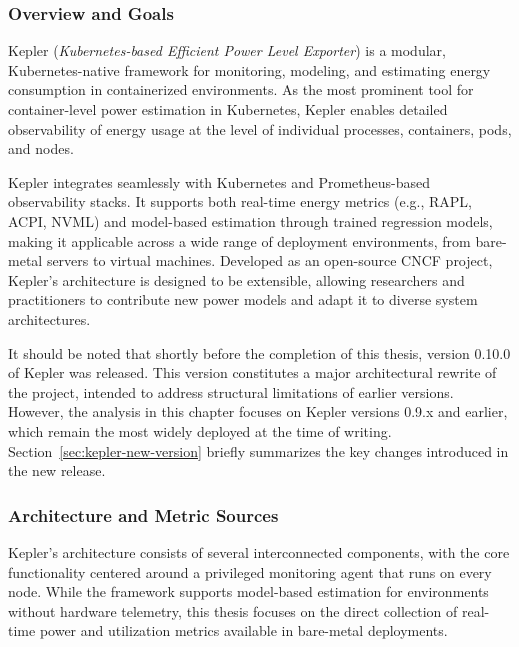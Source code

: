 \subsubsection{Overview and Goals}
\label{sec:kepler-overview}

Kepler (\textit{Kubernetes-based Efficient Power Level Exporter})\parencite{kepler_energy} is a modular, Kubernetes-native framework for monitoring, modeling, and estimating energy consumption in containerized environments. As the most prominent tool for container-level power estimation in Kubernetes, Kepler enables detailed observability of energy usage at the level of individual processes, containers, pods, and nodes\parencite{amaralKeplerFrameworkCalculate2023}.

Kepler integrates seamlessly with Kubernetes and Prometheus-based observability stacks. It supports both real-time energy metrics (e.g., RAPL, ACPI, NVML) and model-based estimation through trained regression models, making it applicable across a wide range of deployment environments, from bare-metal servers to virtual machines. Developed as an open-source CNCF project, Kepler’s architecture is designed to be extensible, allowing researchers and practitioners to contribute new power models and adapt it to diverse system architectures.

It should be noted that shortly before the completion of this thesis, version 0.10.0 of Kepler was released. This version constitutes a major architectural rewrite of the project, intended to address structural limitations of earlier versions. However, the analysis in this chapter focuses on Kepler versions 0.9.x and earlier, which remain the most widely deployed at the time of writing. Section~\ref{sec:kepler-new-version} briefly summarizes the key changes introduced in the new release.
\subsubsection{Architecture and Metric Sources}
\label{sec:kepler-architecture}

Kepler's architecture consists of several interconnected components, with the core functionality centered around a privileged monitoring agent that runs on every node. While the framework supports model-based estimation for environments without hardware telemetry, this thesis focuses on the direct collection of real-time power and utilization metrics available in bare-metal deployments.

